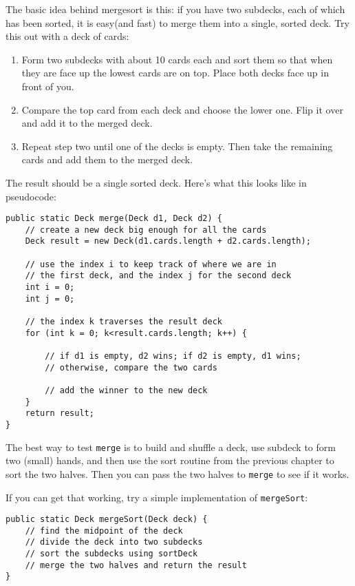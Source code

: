 \documentclass[12pt]{book}
\theoremstyle{definition}
\begin{document}
The basic idea behind mergesort is this: if you have two subdecks,
each of which has been sorted, it is easy(and fast) to merge them
into a single, sorted deck.  Try this out with a deck of cards:

\begin{enumerate}

\item Form two subdecks with about 10 cards each and sort
them so that when they are face up the lowest cards are on
top.  Place both decks face up in front of you.

\item Compare the top card from each deck and choose the
lower one.  Flip it over and add it to the merged deck.

\item Repeat step two until one of the decks is empty.
Then take the remaining cards and add them to the merged
deck.

\end{enumerate}

The result should be a single sorted deck.  Here's what this
looks like in pseudocode:

\begin{lstlisting}
public static Deck merge(Deck d1, Deck d2) {
    // create a new deck big enough for all the cards
    Deck result = new Deck(d1.cards.length + d2.cards.length);

    // use the index i to keep track of where we are in
    // the first deck, and the index j for the second deck
    int i = 0;
    int j = 0;
		
    // the index k traverses the result deck
    for (int k = 0; k<result.cards.length; k++) {
			
        // if d1 is empty, d2 wins; if d2 is empty, d1 wins;
        // otherwise, compare the two cards
			
        // add the winner to the new deck
    }
    return result;
}
\end{lstlisting}

The best way to test {\tt merge} is to build and shuffle a deck,
use subdeck to form two (small) hands, and then use the sort
routine from the previous chapter to sort the two halves.  Then
you can pass the two halves to {\tt merge} to see if it works.


If you can get that working, try a simple implementation of
{\tt mergeSort}:

\begin{lstlisting}
public static Deck mergeSort(Deck deck) {
    // find the midpoint of the deck
    // divide the deck into two subdecks
    // sort the subdecks using sortDeck
    // merge the two halves and return the result
}
\end{lstlisting}
\end{document}
